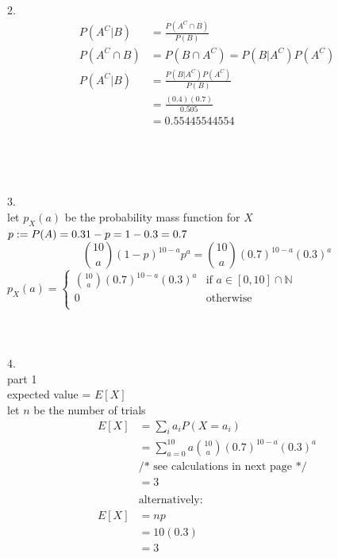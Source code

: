 \documentclass[12pt,border=4pt,multi]{article}%
\begin{document}
\\
\\
\\
\\
2.
\begin{align*}
P(A^C|B) &= \frac{P(A^C \cap B)}{P(B)}\\
P(A^C \cap B) &= P(B \cap A^C) = P(B|A^C)P(A^C)\\
P(A^C|B) &= \frac{P(B|A^C)P(A^C)}{P(B)}\\
&= \frac{(0.4)(0.7)}{0.505}\\
&= \boxed{0.55445544554}\\
\end{align*}
\\
\\
\\
\\
3.\\
let $p_X(a)$ be the probability mass function for $X$\\
$p := P(A) = 0.3\\
1 - p = 1 - 0.3 = 0.7$
\[\binom{10}{a}(1 - p)^{10 - a}p^a = \binom{10}{a}(0.7)^{10 - a}(0.3)^a\]
{\large
$p_X(a) =
\begin{cases}
\binom{10}{a}(0.7)^{10 - a}(0.3)^a & \text{if } a \in [0, 10] \cap \mathbb{N}\\
0 & \text{otherwise}\\
\end{cases}
$}
\\
\\
\\
\\
4.\\
part 1\\
expected value = $E[X]$\\
let $n$ be the number of trials
\begin{align*}
E[X] &= \sum_i a_i P(X = a_i)\\
&= \sum_{a = 0}^{10} a\binom{10}{a}(0.7)^{10 - a}(0.3)^a\\
&\text{/* see calculations in next page */}\\
&= \boxed{3}\\
\\
&\text{alternatively:}\\
E[X] &= np\\
&= 10(0.3)\\
&= \boxed{3}\\
\end{align*}
\\
\\
\\
\end{document}
